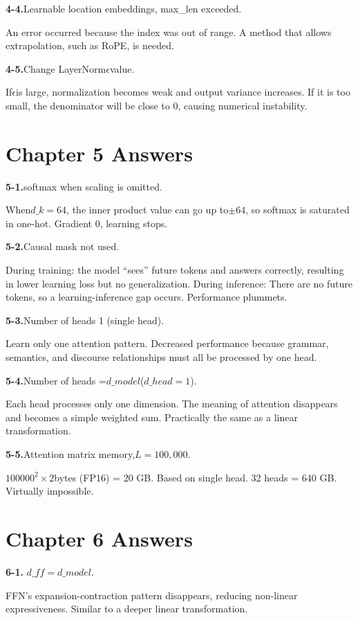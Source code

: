 \textbf{4-4.}Learnable location embeddings, max\_len exceeded.

An error occurred because the index was out of range. A method that allows extrapolation, such as RoPE, is needed.

\textbf{4-5.}Change LayerNorm$\epsilon$value.

If$\epsilon$is large, normalization becomes weak and output variance increases. If it is too small, the denominator will be close to 0, causing numerical instability.

\section{Chapter 5 Answers}

\textbf{5-1.}softmax when scaling is omitted.

When$d\_k=64$, the inner product value can go up to$\pm 64$, so softmax is saturated in one-hot. Gradient 0, learning stops.

\textbf{5-2.}Causal mask not used.

During training: the model ``sees'' future tokens and answers correctly, resulting in lower learning loss but no generalization.
During inference: There are no future tokens, so a learning-inference gap occurs. Performance plummets.

\textbf{5-3.}Number of heads 1 (single head).

Learn only one attention pattern. Decreased performance because grammar, semantics, and discourse relationships must all be processed by one head.

\textbf{5-4.}Number of heads =$d\_{model}$($d\_{head}=1$).

Each head processes only one dimension. The meaning of attention disappears and becomes a simple weighted sum. Practically the same as a linear transformation.

\textbf{5-5.}Attention matrix memory,$L=100,000$.

$100000^2 \times 2$bytes (FP16) = 20 GB. Based on single head. 32 heads = 640 GB. Virtually impossible.

\section{Chapter 6 Answers}

\textbf{6-1.} $d\_{ff} = d\_{model}$.

FFN's expansion-contraction pattern disappears, reducing non-linear expressiveness. Similar to a deeper linear transformation.

